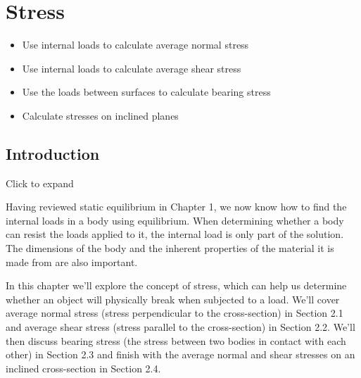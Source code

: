 \documentclass[
  letterpaper,
  DIV=11,
  numbers=noendperiod]{scrreprt}
\providecommand{\tightlist}{%
  \setlength{\itemsep}{0pt}\setlength{\parskip}{0pt}}\usepackage{longtable,booktabs,array}
\begin{document}

\chapter{Stress}\label{sec-stress}

\begin{tcolorbox}[enhanced jigsaw, colbacktitle=quarto-callout-note-color!10!white, title={Learning Objectives}, coltitle=black, leftrule=.75mm, rightrule=.15mm, opacityback=0, breakable, colframe=quarto-callout-note-color-frame, left=2mm, arc=.35mm, colback=white, bottomrule=.15mm, bottomtitle=1mm, toptitle=1mm, titlerule=0mm, opacitybacktitle=0.6, toprule=.15mm]

\begin{itemize}
\tightlist
\item
  Use internal loads to calculate average normal stress
\item
  Use internal loads to calculate average shear stress
\item
  Use the loads between surfaces to calculate bearing stress
\item
  Calculate stresses on inclined planes
\end{itemize}

\end{tcolorbox}

\section{Introduction}\label{introduction-2}

Click to expand

Having reviewed static equilibrium in Chapter 1, we now know how to find
the internal loads in a body using equilibrium. When determining whether
a body can resist the loads applied to it, the internal load is only
part of the solution. The dimensions of the body and the inherent
properties of the material it is made from are also important.

In this chapter we'll explore the concept of stress, which can help us
determine whether an object will physically break when subjected to a
load. We'll cover average normal stress (stress perpendicular to the
cross-section) in Section 2.1 and average shear stress (stress parallel
to the cross-section) in Section 2.2. We'll then discuss bearing stress
(the stress between two bodies in contact with each other) in Section
2.3 and finish with the average normal and shear stresses on an inclined
cross-section in Section 2.4.
\end{document}
